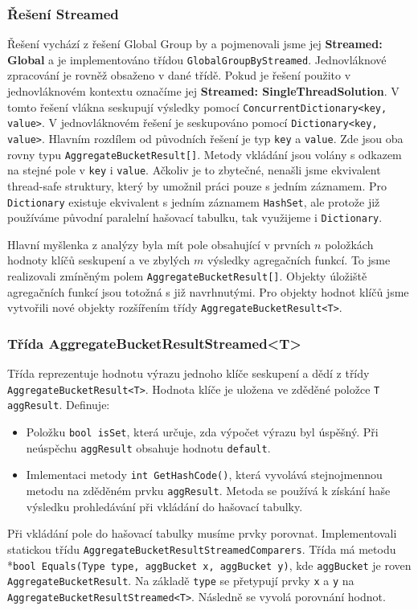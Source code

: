 \subsubsection{Řešení Streamed} \label{impl.improvement.groupby.streamed}

Řešení vychází z řešení Global Group by a pojmenovali jsme jej \textbf{Streamed: Global} a je implementováno třídou \texttt{GlobalGroupByStreamed}.
Jednovláknové zpracování je rovněž obsaženo v dané třídě.
Pokud je řešení použito v jednovláknovém kontextu označíme jej \textbf{Streamed: SingleThreadSolution}.
V tomto řešení vlákna seskupují výsledky pomocí \texttt{ConcurrentDictionary<key, value>}.
V jednovláknovém řešení je seskupováno pomocí \texttt{Dictionary<key, value>}.
Hlavním rozdílem od původních řešení je typ \texttt{key} a \texttt{value}.
Zde jsou oba rovny typu \texttt{AggregateBucketResult[]}.
Metody vkládání jsou volány s odkazem na stejné pole v \texttt{key} i \texttt{value}.
Ačkoliv je to zbytečné, nenašli jsme ekvivalent thread-safe struktury, který by umožnil práci pouze s jedním záznamem.
Pro \texttt{Dictionary} existuje ekvivalent s jedním záznamem \texttt{HashSet}, ale protože již používáme původní paralelní hašovací tabulku, tak využijeme i \texttt{Dictionary}. 

Hlavní myšlenka z analýzy byla mít pole obsahující v prvních $n$ položkách hodnoty klíčů seskupení a ve zbylých $m$ výsledky agregačních funkcí.
To jsme realizovali zmíněným polem \texttt{AggregateBucketResult[]}.
Objekty úložiště agregačních funkcí jsou totožná s již navrhnutými.
Pro objekty hodnot klíčů jsme vytvořili nové objekty rozšířením třídy \texttt{AggregateBucketResult<T>}.

\subsubsection{Třída AggregateBucketResultStreamed<T>}

Třída reprezentuje hodnotu výrazu jednoho klíče seskupení a dědí z třídy \texttt{AggregateBucketResult<T>}.
Hodnota klíče je uložena ve zděděné položce \texttt{T aggResult}.
Definuje:
\begin{itemize}
\item Položku \texttt{bool isSet}, která určuje, zda výpočet výrazu byl úspěšný.
Při neúspěchu \texttt{aggResult} obsahuje hodnotu \texttt{default}. 
\item Imlementaci metody \texttt{int GetHashCode()}, která vyvolává stejnojmennou metodu na zděděném prvku \texttt{aggResult}.
Metoda se používá k získání haše výsledku prohledávání při vkládání do hašovací tabulky.
\end{itemize}
Při vkládání pole do hašovací tabulky musíme prvky porovnat. 
Implementovali statickou třídu \texttt{AggregateBucketResultStreamedComparers}.
Třída má metodu \\*\texttt{bool Equals(Type type, aggBucket x, aggBucket y)}, kde \texttt{aggBucket} je roven \texttt{AggregateBucketResult}.
Na základě \texttt{type} se přetypují prvky \texttt{x} a \texttt{y} na \texttt{AggregateBucketResultStreamed<T>}.
Následně se vyvolá porovnání hodnot.

